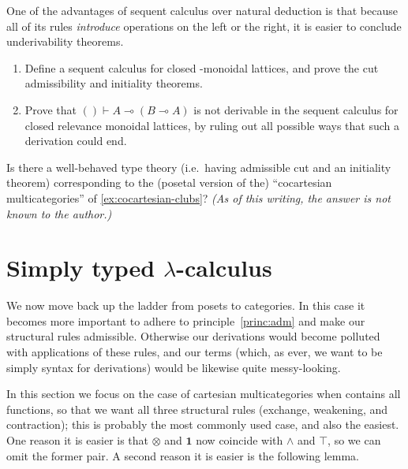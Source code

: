 \documentclass{book}
\let\types\vdash
\let\meet\wedge
\def\one{\mathbf{1}}
\let\tensor\otimes
\let\hom\multimap
\begin{document}
\begin{ex}\label{ex:seqcalc-logic}
  One of the advantages of sequent calculus over natural deduction is that because all of its rules \emph{introduce} operations on the left or the right, it is easier to conclude underivability theorems.
  \begin{enumerate}
  \item Define a sequent calculus for closed \fS-monoidal lattices, and prove the cut admissibility and initiality theorems.
  \item Prove that $()\types A\hom (B\hom A)$ is not derivable in the sequent calculus for closed relevance monoidal lattices, by ruling out all possible ways that such a derivation could end.
  \end{enumerate}
\end{ex}

\begin{ex}\label{ex:cocartesian-typetheory}
  Is there a well-behaved type theory (i.e.\ having admissible cut and an initiality theorem) corresponding to the (posetal version of the) ``cocartesian multicategories'' of \cref{ex:cocartesian-clubs}?
  \textit{(As of this writing, the answer is not known to the author.)}
\end{ex}



\section{Simply typed $\lambda$-calculus}
\label{sec:stlc}
\label{sec:cartmoncat}

We now move back up the ladder from posets to categories.
In this case it becomes more important to adhere to principle~\eqref{princ:adm} and make our structural rules admissible.
Otherwise our derivations would become polluted with applications of these rules, and our terms (which, as ever, we want to be simply syntax for derivations) would be likewise quite messy-looking.

In this section we focus on the case of cartesian multicategories when \fS contains all functions, so that we want all three structural rules (exchange, weakening, and contraction); this is probably the most commonly used case, and also the easiest.
One reason it is easier is that $\tensor$ and $\one$ now coincide with $\meet$ and $\top$, so we can omit the former pair.
A second reason it is easier is the following lemma.
\end{document}
